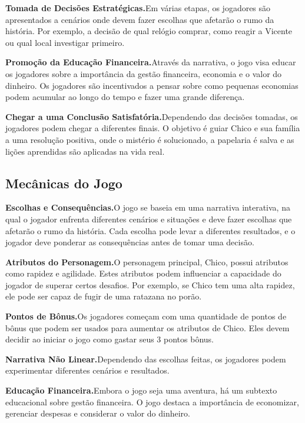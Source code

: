 \medskip\noindent \textbf{Tomada de Decisões Estratégicas.}\quad Em várias etapas, os jogadores são apresentados a cenários onde devem fazer escolhas que afetarão o rumo da história. Por exemplo, a decisão de qual relógio comprar, como reagir a Vicente ou qual local investigar primeiro.

\medskip\noindent \textbf{Promoção da Educação Financeira.}\quad Através da narrativa, o jogo visa educar os jogadores sobre a importância da gestão financeira, economia e o valor do dinheiro. Os jogadores são incentivados a pensar sobre como pequenas economias podem acumular ao longo do tempo e fazer uma grande diferença.

\medskip\noindent \textbf{Chegar a uma Conclusão Satisfatória.}\quad Dependendo das decisões tomadas, os jogadores podem chegar a diferentes finais. O objetivo é guiar Chico e sua família a uma resolução positiva, onde o mistério é solucionado, a papelaria é salva e as lições aprendidas são aplicadas na vida real.


\subsection{Mecânicas do Jogo}

\medskip\noindent \textbf{Escolhas e Consequências.}\quad O jogo se baseia em uma narrativa interativa, na qual o jogador enfrenta diferentes cenários e situações e deve fazer escolhas que afetarão o rumo da história. Cada escolha pode levar a diferentes resultados, e o jogador deve ponderar as consequências antes de tomar uma decisão.

\medskip\noindent \textbf{Atributos do Personagem.}\quad O personagem principal, Chico, possui atributos como rapidez e agilidade. Estes atributos podem influenciar a capacidade do jogador de superar certos desafios. Por exemplo, se Chico tem uma alta rapidez, ele pode ser capaz de fugir de uma ratazana no porão.

\medskip\noindent \textbf{Pontos de Bônus.}\quad Os jogadores começam com uma quantidade de pontos de bônus que podem ser usados para aumentar os atributos de Chico. Eles devem decidir ao iniciar o jogo como gastar seus 3 pontos bônus.

\medskip\noindent \textbf{Narrativa Não Linear.}\quad Dependendo das escolhas feitas, os jogadores podem experimentar diferentes cenários e resultados.

\medskip\noindent \textbf{Educação Financeira.}\quad Embora o jogo seja uma aventura, há um subtexto educacional sobre gestão financeira. O jogo destaca a importância de economizar, gerenciar despesas e considerar o valor do dinheiro.

